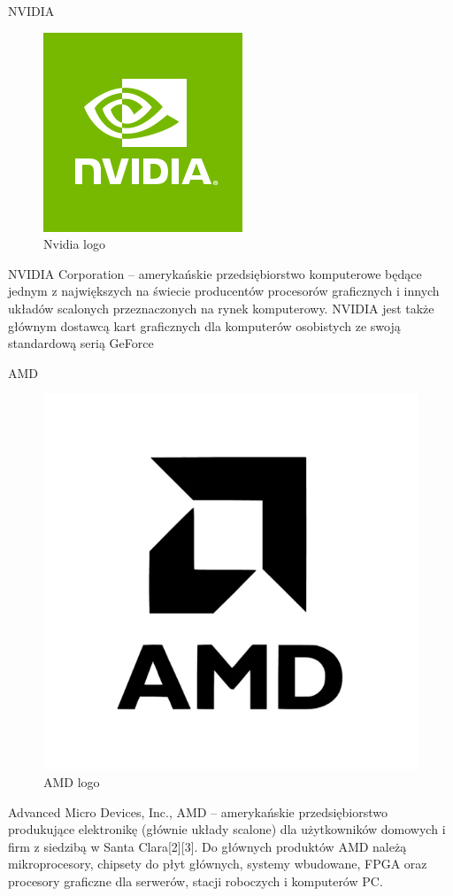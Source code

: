 \documentclass[aspectratio=169,xcolor=dvipsnames, t]{beamer}
\begin{document}
\begin{frame}{NVIDIA}
    \begin{figure}
    \centering
    \includegraphics[width=0.5\linewidth]{nvidia.png}
    \caption{Nvidia logo}
    \label{fig:nvidia}
\end{figure}

NVIDIA Corporation – amerykańskie przedsiębiorstwo komputerowe będące jednym z największych na świecie producentów procesorów graficznych i innych układów scalonych przeznaczonych na rynek komputerowy. NVIDIA jest także głównym dostawcą kart graficznych dla komputerów osobistych ze swoją standardową serią GeForce

\end{frame}
\begin{frame}{AMD}
    \begin{figure}
    \centering
    \includegraphics[width=0.5\linewidth]{amd.png}
    \caption{AMD logo}
    \label{fig:AMD}
\end{figure}

Advanced Micro Devices, Inc., AMD – amerykańskie przedsiębiorstwo produkujące elektronikę (głównie układy scalone) dla użytkowników domowych i firm z siedzibą w Santa Clara[2][3]. Do głównych produktów AMD należą mikroprocesory, chipsety do płyt głównych, systemy wbudowane, FPGA oraz procesory graficzne dla serwerów, stacji roboczych i komputerów PC.
\end{frame}
\end{document}
